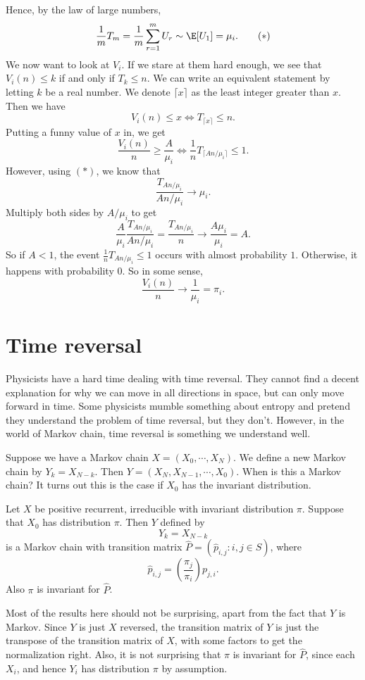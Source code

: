 \documentclass[a4paper]{article}
\begin{document}
Hence, by the law of large numbers,
\[
  \frac{1}{m} T_m = \frac{1}{m} \sum_{r = 1}^m U_r \sim \E [U_1] = \mu_i. \tag{$*$}
\]
We now want to look at $V_i$. If we stare at them hard enough, we see that $V_i(n) \leq k$ if and only if $T_k \leq n$. We can write an equivalent statement by letting $k$ be a real number. We denote $\lceil x\rceil$ as the least integer greater than $x$. Then we have
\[
  V_i(n) \leq x \Leftrightarrow T_{\lceil x\rceil} \leq n.
\]
Putting a funny value of $x$ in, we get
\[
  \frac{V_i(n)}{n} \geq \frac{A}{\mu_i} \Leftrightarrow \frac{1}{n} T_{\lceil An/\mu_i\rceil} \leq 1.
\]
However, using $(*)$, we know that
\[
  \frac{T_{An/\mu_i}}{An/\mu_i} \to \mu_i.
\]
Multiply both sides by $A/\mu_i$ to get
\[
  \frac{A}{\mu_i} \frac{T_{An/\mu_i}}{An/\mu_i} = \frac{T_{An/\mu_i}}{n} \to \frac{A \mu_i}{\mu_i} = A.
\]
So if $A < 1$, the event $\frac{1}{n}T_{An/\mu_i} \leq 1$ occurs with almost probability $1$. Otherwise, it happens with probability $0$. So in some sense,
\[
  \frac{V_i(n)}{n} \to \frac{1}{\mu_i} = \pi_i.
\]
\section{Time reversal}
Physicists have a hard time dealing with time reversal. They cannot find a decent explanation for why we can move in all directions in space, but can only move forward in time. Some physicists mumble something about entropy and pretend they understand the problem of time reversal, but they don't. However, in the world of Markov chain, time reversal is something we understand well.

Suppose we have a Markov chain $X = (X_0, \cdots, X_N)$. We define a new Markov chain by $Y_k = X_{N - k}$. Then $Y = (X_N, X_{N - 1}, \cdots, X_0)$. When is this a Markov chain? It turns out this is the case if $X_0$ has the invariant distribution.

\begin{thm}
  Let $X$ be positive recurrent, irreducible with invariant distribution $\pi$. Suppose that $X_0$ has distribution $\pi$. Then $Y$ defined by
  \[
    Y_{k} = X_{N - k}
  \]
  is a Markov chain with transition matrix $\hat{P} = (\hat{p}_{i, j}: i, j \in S)$, where
  \[
    \hat{p}_{i, j} = \left(\frac{\pi_j}{\pi_i}\right) p_{j, i}.
  \]
  Also $\pi$ is invariant for $\hat{P}$.
\end{thm}
Most of the results here should not be surprising, apart from the fact that $Y$ is Markov. Since $Y$ is just $X$ reversed, the transition matrix of $Y$ is just the transpose of the transition matrix of $X$, with some factors to get the normalization right. Also, it is not surprising that $\pi$ is invariant for $\hat{P}$, since each $X_i$, and hence $Y_i$ has distribution $\pi$ by assumption.
\end{document}
